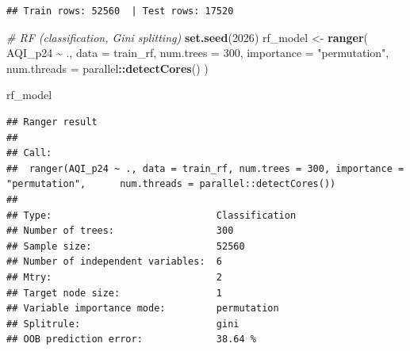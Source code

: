 \documentclass[
]{article}
\newenvironment{Shaded}{\begin{snugshade}}{\end{snugshade}}
\newcommand{\AttributeTok}[1]{\textcolor[rgb]{0.13,0.29,0.53}{#1}}
\newcommand{\CommentTok}[1]{\textcolor[rgb]{0.56,0.35,0.01}{\textit{#1}}}
\newcommand{\DecValTok}[1]{\textcolor[rgb]{0.00,0.00,0.81}{#1}}
\newcommand{\FunctionTok}[1]{\textcolor[rgb]{0.13,0.29,0.53}{\textbf{#1}}}
\newcommand{\NormalTok}[1]{#1}
\newcommand{\OtherTok}[1]{\textcolor[rgb]{0.56,0.35,0.01}{#1}}
\newcommand{\SpecialCharTok}[1]{\textcolor[rgb]{0.81,0.36,0.00}{\textbf{#1}}}
\newcommand{\StringTok}[1]{\textcolor[rgb]{0.31,0.60,0.02}{#1}}
\begin{document}
\begin{verbatim}
## Train rows: 52560  | Test rows: 17520
\end{verbatim}

\begin{Shaded}
\begin{Highlighting}[]
\CommentTok{\# RF (classification, Gini splitting)}
\FunctionTok{set.seed}\NormalTok{(}\DecValTok{2026}\NormalTok{)}
\NormalTok{rf\_model }\OtherTok{\textless{}{-}} \FunctionTok{ranger}\NormalTok{(}
\NormalTok{  AQI\_p24 }\SpecialCharTok{\textasciitilde{}}\NormalTok{ .,}
  \AttributeTok{data =}\NormalTok{ train\_rf,}
  \AttributeTok{num.trees =} \DecValTok{300}\NormalTok{,}
  \AttributeTok{importance =} \StringTok{"permutation"}\NormalTok{,}
  \AttributeTok{num.threads =}\NormalTok{ parallel}\SpecialCharTok{::}\FunctionTok{detectCores}\NormalTok{()}
\NormalTok{)}

\NormalTok{rf\_model}
\end{Highlighting}
\end{Shaded}

\begin{verbatim}
## Ranger result
## 
## Call:
##  ranger(AQI_p24 ~ ., data = train_rf, num.trees = 300, importance = "permutation",      num.threads = parallel::detectCores()) 
## 
## Type:                             Classification 
## Number of trees:                  300 
## Sample size:                      52560 
## Number of independent variables:  6 
## Mtry:                             2 
## Target node size:                 1 
## Variable importance mode:         permutation 
## Splitrule:                        gini 
## OOB prediction error:             38.64 %
\end{verbatim}
\end{document}
